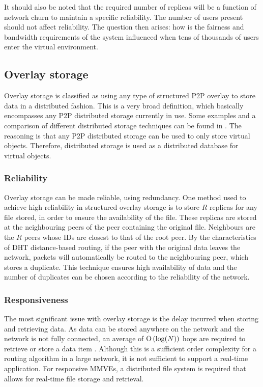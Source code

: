 It should also be noted that the required number of replicas will be a function of network churn to maintain a specific reliability. The number of users present should not affect reliability. The question then arises: how is the fairness and bandwidth requirements of the system influenced when tens of thousands of users enter the virtual environment.

\subsection{Overlay storage}
\label{overlay_storage}

Overlay storage is classified as using any type of structured P2P overlay to store data in a distributed fashion. This is a very broad definition, which basically encompasses any P2P distributed storage currently in use. Some examples and a comparison of different distributed storage techniques can be found in \cite{Hasan_distributed_storage_survey}. The reasoning is that any P2P distributed storage can be used to only store virtual objects. Therefore, distributed storage is used as a distributed database for virtual objects.

\subsubsection{Reliability}
\label{overlay_storage_reliability}

Overlay storage can be made reliable, using redundancy. One method used to achieve high reliability in structured overlay storage is to store $R$ replicas for any file stored, in order to ensure the availability of the file. These replicas are stored at the neighbouring peers of the peer containing the original file. Neighbours are the $R$ peers whose IDs are closest to that of the root peer. By the characteristics of DHT distance-based routing, if the peer with the original data leaves the network, packets will automatically be routed to the neighbouring peer, which stores a duplicate. This technique ensures high availability of data and the number of duplicates can be chosen according to the reliability of the
network.


\subsubsection{Responsiveness}

The most significant issue with overlay storage is the delay incurred when storing and retrieving data. As data can be stored anywhere on the network and the network is not fully connected, an average of $\operatorname{O}\left(\log(N)\right)$ hops are required to retrieve or store a data item \cite{storage_and_chaching_PAST}. Although this is a sufficient order complexity for a routing algorithm in a large network, it is not sufficient to support a real-time application. For responsive MMVEs, a distributed file system is required that allows for real-time file storage and retrieval.

